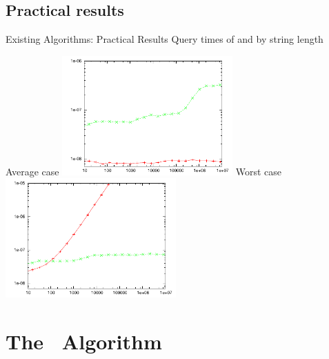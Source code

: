 \documentclass{beamer}
\begin{document}
\subsection{Practical results}
\begin{frame}{Existing Algorithms: Practical Results}
    Query times of
    \textcolor{red}{} and
    \textcolor{green}{}
    by string length
    \begin{multicols}{2}{
        \begin{center}
            Average case
            \includegraphics[width=0.49\textwidth,type=pdf,ext=.pdf,read=.pdf]{../src/results/length-rmq-directcomp-slide-rand10.plt}
            \newpage
            Worst case
            \includegraphics[width=0.49\textwidth,type=pdf,ext=.pdf,read=.pdf]{../src/results/length-rmq-directcomp-slide-alla.plt}
        \end{center}
    }
    \end{multicols}

\end{frame}

\section{The \fprintk\ Algorithm}
\end{document}
